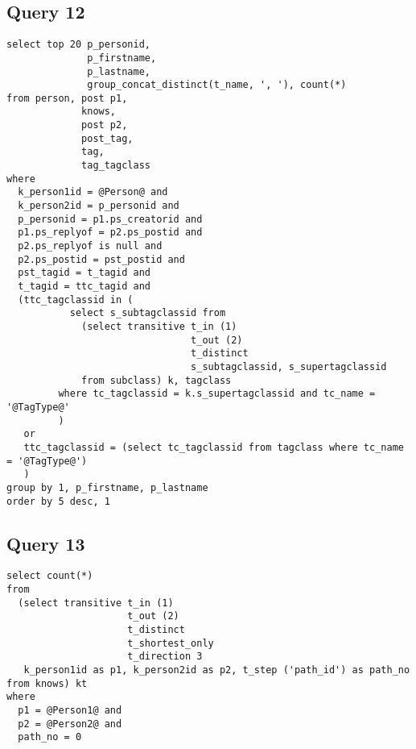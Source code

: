 \subsection{Query 12}
\begin{verbatim}
select top 20 p_personid, 
              p_firstname, 
              p_lastname, 
              group_concat_distinct(t_name, ', '), count(*)
from person, post p1, 
             knows, 
             post p2, 
             post_tag, 
             tag, 
             tag_tagclass
where
  k_person1id = @Person@ and
  k_person2id = p_personid and
  p_personid = p1.ps_creatorid and
  p1.ps_replyof = p2.ps_postid and
  p2.ps_replyof is null and
  p2.ps_postid = pst_postid and
  pst_tagid = t_tagid and
  t_tagid = ttc_tagid and
  (ttc_tagclassid in (
           select s_subtagclassid from
             (select transitive t_in (1) 
                                t_out (2) 
                                t_distinct 
                                s_subtagclassid, s_supertagclassid
             from subclass) k, tagclass
         where tc_tagclassid = k.s_supertagclassid and tc_name = '@TagType@'
         )
   or
   ttc_tagclassid = (select tc_tagclassid from tagclass where tc_name = '@TagType@')
   )
group by 1, p_firstname, p_lastname
order by 5 desc, 1

\end{verbatim}


\subsection{Query 13}
\begin{verbatim}
select count(*)
from
  (select transitive t_in (1) 
                     t_out (2) 
                     t_distinct 
                     t_shortest_only 
                     t_direction 3
   k_person1id as p1, k_person2id as p2, t_step ('path_id') as path_no from knows) kt
where
  p1 = @Person1@ and
  p2 = @Person2@ and
  path_no = 0
\end{verbatim}


